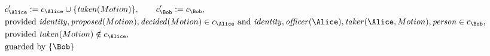 \begin{align*}
&
c'_
{
\Alice
}
 := 
c_
{
\Alice
}
 \cup 
\{
\mathit{\detokenize{
taken
}}
(
Motion
)
\}
, \qquad 
c'_
{
\Bob
}
 := 
c_
{
\Bob
}
,\\
&
\text{provided } 
\mathit{\detokenize{
identity
}}
,
\mathit{\detokenize{
proposed
}}
(
Motion
)
,
\mathit{\detokenize{
decided
}}
(
Motion
)
 \in c_
{
\Alice
}
 \text{ and } 
\mathit{\detokenize{
identity
}}
,
\mathit{\detokenize{
officer
}}
(
\Alice
)
,
\mathit{\detokenize{
taker
}}
(
\Alice
,
Motion
)
,
\mathit{\detokenize{
person
}}
 \in c_
{
\Bob
}
,\\
&
\text{provided } 
\mathit{\detokenize{
taken
}}
(
Motion
)
 \notin c_
{
\Alice
}
,\\
&
\text{guarded by } \{
\Bob
\}
\end{align*}

